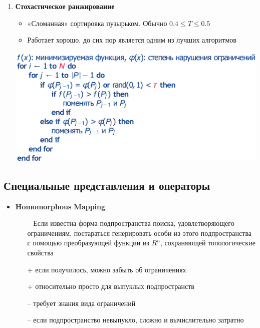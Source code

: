\begin{enumerate}
\begin{itemize}
    \end{itemize}

    \item \textbf{Стохастическое ранжирование}
    \begin{itemize}
        \item «Сломанная» сортировка пузырьком. Обычно $0.4 \leq T \leq 0.5$
        \item Работает хорошо, до сих пор является одним из лучших алгоритмов
    \end{itemize}
    \includegraphics[scale=0.5]{images/formula_min_func.png}

\end{enumerate}

\subsection{Специальные представления и операторы}
\begin{itemize}
    \item \textbf{Homomorphous Mapping}
    \begin{itemize}
        \item [~] Если известна форма подпространства поиска, удовлетворяющего ограничениям, постараться генерировать особи из этого подпространства с помощью преобразующей функции из $R^n$, сохраняющей топологические свойства
        \item [+] если получилось, можно забыть об ограничениях
        \item [+] относительно просто для выпуклых подпространств
        \item [--] требует знания вида ограничений
        \item [--] если подпространство невыпукло, сложно и вычислительно затратно

    \end{itemize}
\end{itemize}

